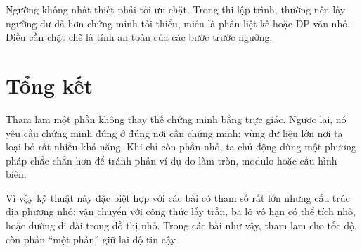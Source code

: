 \documentclass[11pt]{article}
\begin{document}
Ngưỡng không nhất thiết phải tối ưu chặt. Trong thi lập trình, thường nên lấy
ngưỡng dư dả hơn chứng minh tối thiểu, miễn là phần liệt kê hoặc DP vẫn nhỏ.
Điều cần chặt chẽ là tính an toàn của các bước trước ngưỡng.

\section{Tổng kết}

Tham lam một phần không thay thế chứng minh bằng trực giác. Ngược lại, nó yêu
cầu chứng minh đúng ở đúng nơi cần chứng minh: vùng dữ liệu lớn nơi ta loại
bỏ rất nhiều khả năng. Khi chỉ còn phần nhỏ, ta chủ động dùng một phương pháp
chắc chắn hơn để tránh phản ví dụ do làm tròn, modulo hoặc cấu hình biên.

Vì vậy kỹ thuật này đặc biệt hợp với các bài có tham số rất lớn nhưng cấu
trúc địa phương nhỏ: vận chuyển với công thức lấy trần, ba lô vô hạn có thể
tích nhỏ, hoặc đường đi dài trong đồ thị nhỏ. Trong các bài như vậy, tham lam
cho tốc độ, còn phần ``một phần'' giữ lại độ tin cậy.
\end{document}

